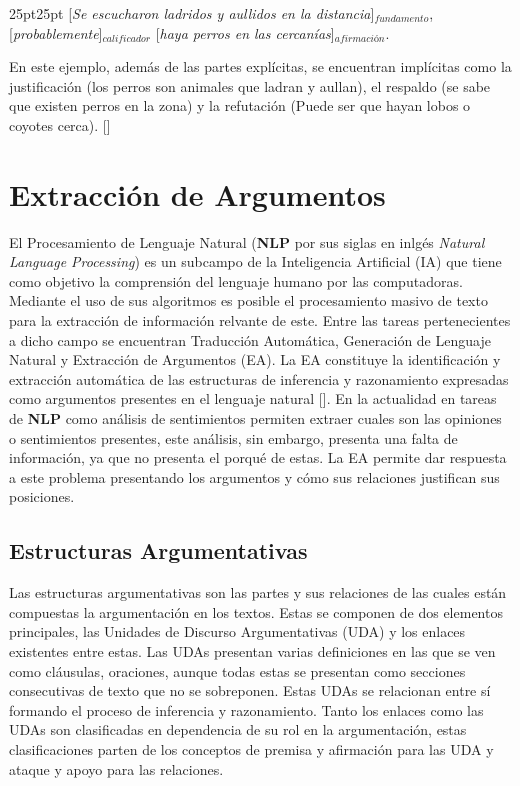\begin{adjustwidth}{25pt}{25pt}
    [\emph{Se escucharon ladridos y aullidos en la distancia}]$_{fundamento}$, 
    [\emph{probablemente}]$_{calificador}$ 
    [\emph{haya perros en las cercanías}]$_{afirmación}$.
\end{adjustwidth}

En este ejemplo, además de las partes explícitas, se encuentran implícitas como la justificación 
(los perros son animales que ladran y aullan), el respaldo (se sabe que existen perros en la zona) y 
la refutación (Puede ser que hayan lobos o coyotes cerca). [\cite{toulminArgument}]
  
\section{Extracción de Argumentos}

El Procesamiento de Lenguaje Natural (\textbf{NLP} por sus siglas en inlgés \emph{Natural Language Processing}) es un 
subcampo de la Inteligencia Artificial (IA) que tiene como objetivo la comprensión del lenguaje humano por 
las computadoras. 
Mediante el uso de sus algoritmos es posible el procesamiento masivo de texto para la extracción de información 
relvante de este. Entre las tareas pertenecientes a dicho campo se encuentran Traducción Automática, 
Generación de Lenguaje Natural y Extracción de Argumentos (EA). La EA constituye la identificación y extracción 
automática de las estructuras de inferencia y 
razonamiento expresadas como argumentos presentes en el lenguaje natural [\cite{lawrence2020argument}].
En la actualidad en tareas de \textbf{NLP} como análisis de sentimientos permiten 
extraer cuales son las opiniones o sentimientos presentes, este análisis, sin embargo, presenta una falta 
de información, ya que no presenta el porqué de estas. La EA permite dar respuesta a este problema presentando
los argumentos y cómo sus relaciones justifican sus posiciones.

\subsection{Estructuras Argumentativas}


Las estructuras argumentativas son las partes y sus relaciones de las cuales están compuestas la argumentación en los textos.
Estas se componen de dos elementos principales, las Unidades de Discurso Argumentativas (UDA) y los enlaces
existentes entre estas. Las UDAs presentan varias definiciones en las que se ven como cláusulas, oraciones, aunque
todas estas se presentan como secciones consecutivas de texto que no se sobreponen. Estas UDAs se relacionan entre 
sí formando el proceso de inferencia y razonamiento.
Tanto los enlaces como las UDAs son clasificadas en dependencia de su rol en la argumentación, estas clasificaciones 
parten de los conceptos de premisa y afirmación para las UDA y ataque y apoyo para las relaciones. 

